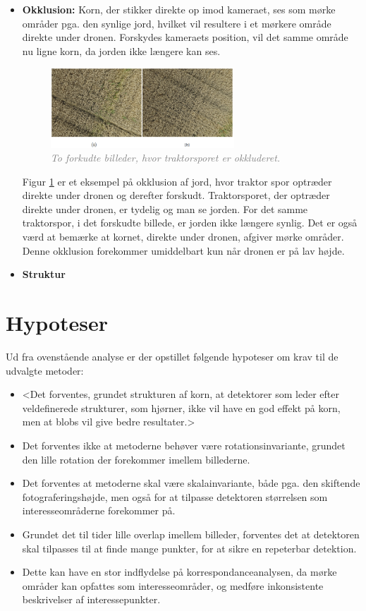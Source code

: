 \begin{itemize}
{Dronen ændrer dog højde under overflyvningen.}
\item{\textbf{Okklusion:}
Korn, der stikker direkte op imod kameraet, ses som mørke områder pga. den synlige jord, hvilket vil resultere i et mørkere område direkte under dronen. Forskydes kameraets position, vil det samme område nu ligne korn, da jorden ikke længere kan ses. 
\begin{figure}[H]
    \centering
    \includegraphics[width=0.65\textwidth]{fig/18.png}
     \vspace{-1em}
    \begin{center}    
       \caption{\textcolor{gray}{\footnotesize \textit{ To forkudte billeder, hvor traktorsporet er okkluderet. }}}
    \label{fig:okklusion}
     \end{center}
     \vspace{-2.5em}
  \end{figure} \noindent
Figur \ref{fig:okklusion} er et eksempel på okklusion af jord, hvor traktor spor optræder direkte under dronen og derefter forskudt. Traktorsporet, der optræder direkte under dronen, er tydelig og man se jorden. For det samme traktorspor, i det forskudte billede, er jorden ikke længere synlig. Det er også værd at bemærke at kornet, direkte under dronen, afgiver mørke områder. Denne okklusion forekommer umiddelbart kun når dronen er på lav højde.}
\item{\textbf{Struktur} }
\end{itemize}
\section{Hypoteser}
Ud fra ovenstående analyse er der opstillet følgende hypoteser om krav til de udvalgte metoder:
\begin{itemize}
\item{ <Det forventes, grundet strukturen af korn, at detektorer som leder efter veldefinerede strukturer, som hjørner, ikke vil have en god effekt på korn, men at blobs vil give bedre resultater.> }
\item{ Det forventes ikke at metoderne behøver være rotationsinvariante, grundet den lille rotation der forekommer imellem billederne. }
\item{Det forventes at metoderne skal være skalainvariante, både pga. den skiftende fotograferingshøjde, men også for at tilpasse detektoren størrelsen som interesseområderne forekommer på.}
\item{Grundet det til tider lille overlap imellem billeder, forventes det at detektoren skal tilpasses til at finde mange punkter, for at sikre en repeterbar detektion.}
\item{Dette kan have en stor indflydelse på korrespondanceanalysen, da mørke områder kan opfattes som interesseområder, og medføre inkonsistente beskrivelser af interessepunkter.}
\end{itemize}
